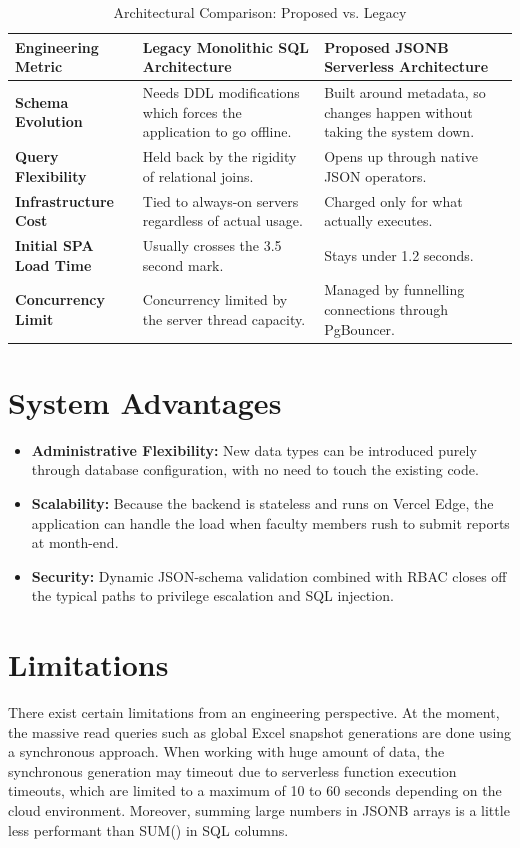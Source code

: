 \documentclass[conference]{IEEEtran}
\begin{document}
\begin{table}[h]
\centering
\caption{Architectural Comparison: Proposed vs. Legacy}
\begin{tabular}{|p{2.2cm}|p{2.6cm}|p{2.6cm}|}
\hline
\textbf{Engineering Metric} & \textbf{Legacy Monolithic SQL Architecture} & \textbf{Proposed JSONB Serverless Architecture} \\ \hline
\textbf{Schema Evolution} & Needs DDL modifications which forces the application to go offline. & Built around metadata, so changes happen without taking the system down. \\ \hline
\textbf{Query Flexibility} & Held back by the rigidity of relational joins. & Opens up through native JSON operators. \\ \hline
\textbf{Infrastructure Cost} & Tied to always-on servers regardless of actual usage. & Charged only for what actually executes. \\ \hline
\textbf{Initial SPA Load Time} & Usually crosses the 3.5 second mark. & Stays under 1.2 seconds. \\ \hline
\textbf{Concurrency Limit} & Concurrency limited by the server thread capacity. & Managed by funnelling connections through PgBouncer. \\ \hline
\end{tabular}
\end{table}

\section{System Advantages}
\begin{itemize}
    \item \textbf{Administrative Flexibility:} New data types can be introduced purely through database configuration, with no need to touch the existing code.
    \item \textbf{Scalability:} Because the backend is stateless and runs on Vercel Edge, the application can handle the load when faculty members rush to submit reports at month-end.
    \item \textbf{Security:} Dynamic JSON-schema validation combined with RBAC closes off the typical paths to privilege escalation and SQL injection.
\end{itemize}

\section{Limitations}
There exist certain limitations from an engineering perspective. At the moment, the massive read queries such as global Excel snapshot generations are done using a synchronous approach. When working with huge amount of data, the synchronous generation may timeout due to serverless function execution timeouts, which are limited to a maximum of 10 to 60 seconds depending on the cloud environment. Moreover, summing large numbers in JSONB arrays is a little less performant than SUM() in SQL columns.
\end{document}
